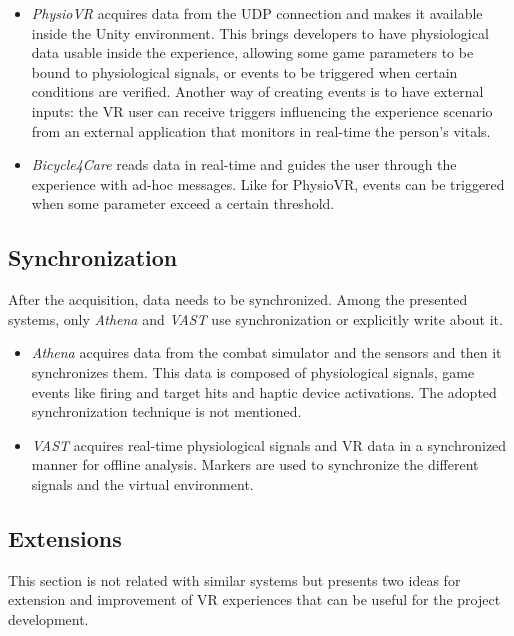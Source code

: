 \documentclass[binding=0.6cm,LaM]{sapthesis}
\begin{document}
\begin{itemize}

\item \textit{PhysioVR} acquires data from the UDP connection and makes it available inside the Unity environment. This brings developers to have physiological data usable inside the experience, allowing some game parameters to be bound to physiological signals, or events to be triggered when certain conditions are verified. Another way of creating events is to have external inputs: the VR user can receive triggers influencing the experience scenario from an external application that monitors in real-time the person's vitals.

\item \textit{Bicycle4Care} reads data in real-time and guides the user through the experience with ad-hoc messages. Like for PhysioVR, events can be triggered when some parameter exceed a certain threshold. 

\end{itemize}

\subsection{Synchronization}
After the acquisition, data needs to be synchronized. Among the presented systems, only \textit{Athena} and \textit{VAST} use synchronization or explicitly write about it.

\begin{itemize}

\item \textit{Athena} acquires data from the combat simulator and the sensors and then it synchronizes them. This data is composed of physiological signals, game events like firing and target hits and haptic device activations. The adopted synchronization technique is not mentioned.

\item \textit{VAST} acquires real-time physiological signals and VR data in a synchronized manner for offline analysis. Markers are used to synchronize the different signals and the virtual environment. 

\end{itemize}

\subsection{Extensions}
This section is not related with similar systems but presents two ideas for extension and improvement of VR experiences that can be useful for the project development.
\end{document}
